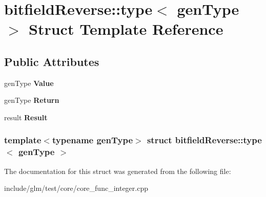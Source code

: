 \hypertarget{structbitfieldReverse_1_1type}{\section{bitfield\-Reverse\-:\-:type$<$ gen\-Type $>$ \-Struct \-Template \-Reference}
\label{structbitfieldReverse_1_1type}
}
\subsection*{\-Public \-Attributes}
\begin{DoxyCompactItemize}
\item 
\hypertarget{structbitfieldReverse_1_1type_ab508e0a8879932551483c03d17dcc780}{gen\-Type {\bfseries \-Value}}\label{structbitfieldReverse_1_1type_ab508e0a8879932551483c03d17dcc780}

\item 
\hypertarget{structbitfieldReverse_1_1type_ae245f3a18e653cb779ce31a4b5caaab0}{gen\-Type {\bfseries \-Return}}\label{structbitfieldReverse_1_1type_ae245f3a18e653cb779ce31a4b5caaab0}

\item 
\hypertarget{structbitfieldReverse_1_1type_a5b67c03467163412dca08661d72f20a3}{result {\bfseries \-Result}}\label{structbitfieldReverse_1_1type_a5b67c03467163412dca08661d72f20a3}

\end{DoxyCompactItemize}
\subsubsection*{template$<$typename gen\-Type$>$ struct bitfield\-Reverse\-::type$<$ gen\-Type $>$}



\-The documentation for this struct was generated from the following file\-:\begin{DoxyCompactItemize}
\item 
include/glm/test/core/core\-\_\-func\-\_\-integer.\-cpp\end{DoxyCompactItemize}
